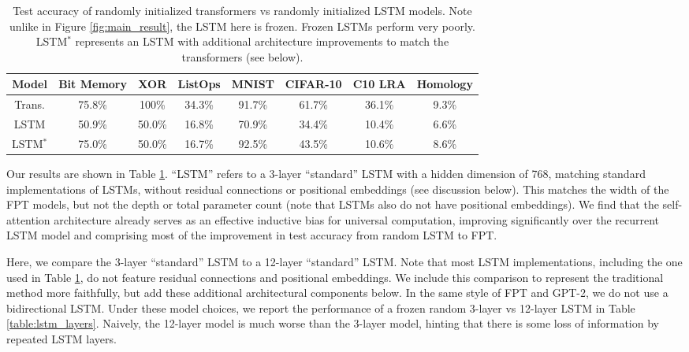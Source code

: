 \begin{table}[h] 
\begin{center}
\begin{tabular}{c|ccccccc}
\toprule
\textbf{Model} & \multicolumn{1}{c}{\bf Bit Memory} & \multicolumn{1}{c}{\bf XOR} & \multicolumn{1}{c}{\bf ListOps} & \multicolumn{1}{c}{\bf MNIST} & \multicolumn{1}{c}{\bf CIFAR-10} & \multicolumn{1}{c}{\bf C10 LRA} & \multicolumn{1}{c}{\bf Homology} \\
\midrule
Trans.   & 75.8\% &  100\% & 34.3\% & 91.7\% & 61.7\% & 36.1\% & 9.3\% \\
LSTM     & 50.9\% & 50.0\% & 16.8\% & 70.9\% & 34.4\% & 10.4\% & 6.6\% \\
LSTM$^*$ & 75.0\% & 50.0\% & 16.7\% & 92.5\% & 43.5\% & 10.6\% & 8.6\% \\
\bottomrule
\end{tabular}
\end{center}
\caption{Test accuracy of randomly initialized transformers vs randomly initialized LSTM models. Note unlike in Figure \ref{fig:main_result}, the LSTM here is frozen. Frozen LSTMs perform very poorly. LSTM$^*$ represents an LSTM with additional architecture improvements to match the transformers (see below).}\label{table:random_architecture}
\end{table}
\vspace{-.5em}

Our results are shown in Table \ref{table:random_architecture}.
``LSTM'' refers to a 3-layer ``standard'' LSTM with a hidden dimension of 768, matching standard implementations of LSTMs, without residual connections or positional embeddings (see discussion below).
This matches the width of the FPT models, but not the depth or total parameter count (note that LSTMs also do not have positional embeddings).
We find that the self-attention architecture already serves as an effective inductive bias for universal computation, improving significantly over the recurrent LSTM model and comprising most of the improvement in test accuracy from random LSTM to FPT.

Here, we compare the 3-layer ``standard'' LSTM to a 12-layer ``standard'' LSTM.
Note that most LSTM implementations, including the one used in Table \ref{table:random_architecture}, do not feature residual connections and positional embeddings.
We include this comparison to represent the traditional method more faithfully, but add these additional architectural components below.
In the same style of FPT and GPT-2, we do not use a bidirectional LSTM.
Under these model choices, we report the performance of a frozen random 3-layer vs 12-layer LSTM in Table \ref{table:lstm_layers}.
Naively, the 12-layer model is much worse than the 3-layer model, hinting that there is some loss of information by repeated LSTM layers.

